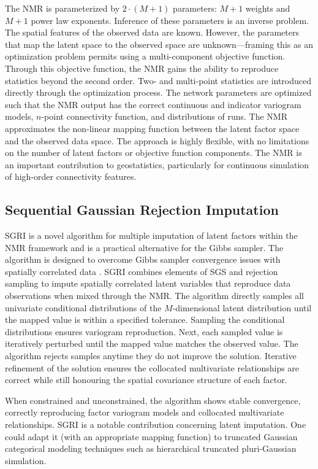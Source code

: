 The \gls{NMR} is parameterized by $2 \cdot (M+1)$ parameters: $M+1$ weights and $M+1$ power law exponents. Inference of these parameters is an inverse problem. The spatial features of the observed data are known. However, the parameters that map the latent space to the observed space are unknown—framing this as an optimization problem permits using a multi-component objective function. Through this objective function, the \gls{NMR} gains the ability to reproduce statistics beyond the second order. Two- and multi-point statistics are introduced directly through the optimization process. The network parameters are optimized such that the \gls{NMR} output has the correct continuous and indicator variogram models, $n$-point connectivity function, and distributions of runs. The \gls{NMR} approximates the non-linear mapping function between the latent factor space and the observed data space. The approach is highly flexible, with no limitations on the number of latent factors or objective function components. The \gls{NMR} is an important contribution to geostatistics, particularly for continuous simulation of high-order connectivity features.

\subsection{Sequential Gaussian Rejection Imputation}
\label{subsec:07sgri}

\Gls{SGRI} is a novel algorithm for multiple imputation of latent factors within the \gls{NMR} framework and is a practical alternative for the Gibbs sampler. The algorithm is designed to overcome Gibbs sampler convergence issues with spatially correlated data \citep{silva2018enhanced}. \Gls{SGRI} combines elements of \gls{SGS} and rejection sampling to impute spatially correlated latent variables that reproduce data observations when mixed through the \gls{NMR}. The algorithm directly samples all univariate conditional distributions of the $M$-dimensional latent distribution until the mapped value is within a specified tolerance. Sampling the conditional distributions ensures variogram reproduction. Next, each sampled value is iteratively perturbed until the mapped value matches the observed value. The algorithm rejects samples anytime they do not improve the solution. Iterative refinement of the solution ensures the collocated multivariate relationships are correct while still honouring the spatial covariance structure of each factor.

When constrained and unconstrained, the algorithm shows stable convergence, correctly reproducing factor variogram models and collocated multivariate relationships. \Gls{SGRI} is a notable contribution concerning latent imputation. One could adapt it (with an appropriate mapping function) to truncated Gaussian categorical modeling techniques such as hierarchical truncated pluri-Gaussian simulation.

